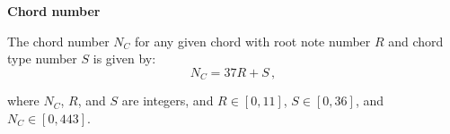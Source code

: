 \documentclass{letter}
\begin{document}
	
	\begin{center}
		\textbf{Chord number}
	\end{center}
	
	The chord number $N_C$ for any given chord with root note number $R$ and chord type number $S$ is given by:
	\begin{equation*}
		N_C = 37R + S \,,
	\end{equation*}
	
	where $N_C$, $R$, and $S$ are integers, and $R \in [0, 11]$, $S \in [0, 36]$, and $N_C \in [0, 443]$.\\
	
	

	
\end{document}
